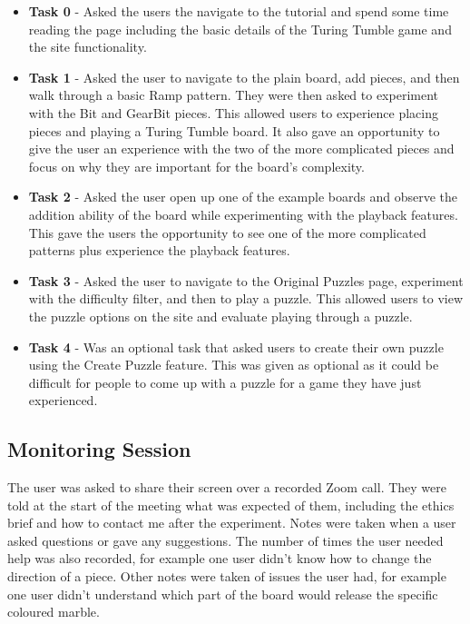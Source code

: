 \documentclass{l4proj}
\begin{document}
\begin{itemize}
    \item \textbf{Task 0} - Asked the users the navigate to the tutorial and spend some time reading the page including the basic details of the Turing Tumble game and the site functionality.
    \item \textbf{Task 1} - Asked the user to navigate to the plain board, add pieces, and then walk through a basic Ramp pattern. They were then asked to experiment with the Bit and GearBit pieces. This allowed users to experience placing pieces and playing a Turing Tumble board. It also gave an opportunity to give the user an experience with the two of the more complicated pieces and focus on why they are important for the board's complexity.
    \item \textbf{Task 2} - Asked the user open up one of the example boards and observe the addition ability of the board while experimenting with the playback features. This gave the users the opportunity to see one of the more complicated patterns plus experience the playback features.
    \item \textbf{Task 3} - Asked the user to navigate to the Original Puzzles page, experiment with the difficulty filter, and then to play a puzzle. This allowed users to view the puzzle options on the site and evaluate playing through a puzzle.
    \item \textbf{Task 4} - Was an optional task that asked users to create their own puzzle using the Create Puzzle feature. This was given as optional as it could be difficult for people to come up with a puzzle for a game they have just experienced.
\end{itemize}

\subsection{Monitoring Session}
The user was asked to share their screen over a recorded Zoom call. They were told at the start of the meeting what was expected of them, including the ethics brief and how to contact me after the experiment. Notes were taken when a user asked questions or gave any suggestions. The number of times the user needed help was also recorded, for example one user didn't know how to change the direction of a piece. Other notes were taken of issues the user had, for example one user didn't understand which part of the board would release the specific coloured marble.
\end{document}
